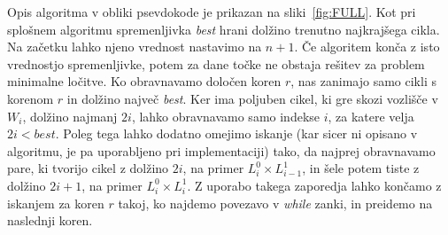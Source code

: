 \documentclass[a4paper, 12pt]{book}
\def\best{\mathit{best}}
\begin{document}

Opis algoritma v obliki psevdokode je prikazan na sliki~\ref{fig:FULL}. Kot pri splošnem algoritmu spremenljivka \textit{best} hrani dolžino trenutno najkrajšega cikla. Na začetku lahko njeno vrednost nastavimo na $n+1$. Če algoritem konča z isto vrednostjo spremenljivke, potem za dane točke ne obstaja rešitev za problem minimalne ločitve. Ko obravnavamo določen koren $r$, nas zanimajo samo cikli s korenom $r$ in dolžino največ \textit{best}. Ker ima poljuben cikel, ki gre skozi vozlišče v $W_i$, dolžino najmanj $2i$, lahko obravnavamo samo indekse $i$, za katere velja $2i < best$. Poleg tega lahko dodatno omejimo iskanje (kar sicer ni opisano v algoritmu, je pa uporabljeno pri implementaciji) tako, da najprej obravnavamo pare, ki tvorijo cikel z dolžino $2i$, na primer $L^0_i\times L^1_{i-1}$, in šele potem tiste z dolžino $2i+1$, na primer $L^0_i\times L^1_i$. Z uporabo takega zaporedja lahko končamo z iskanjem za koren $r$ takoj, ko najdemo povezavo v \textit{while} zanki, in preidemo na naslednji koren.
\end{document}

